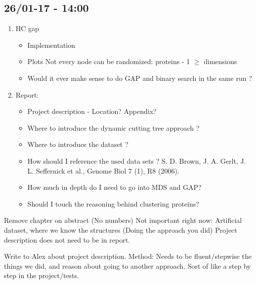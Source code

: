 \documentclass[a4paper,10pt]{article}
\begin{document}
\newpage
\subsection{26/01-17 - 14:00}
\begin{enumerate}
	\item HC gap
		\begin{itemize}
			\item Implementation
			\item Plots
				\subitem Not every node can be randomized: proteins - 1 $\geq$ dimensions
			\item Would it ever make sense to do GAP and binary search in the same run ?
		\end{itemize}
	\item Report:
		\begin{itemize}
			\item Project description - Location? Appendix?
			\item Where to introduce the dynamic cutting tree approach ?
			\item Where to introduce the dataset ?
			\item How should I reference the used data sets ?
				\subitem S. D. Brown, J. A. Gerlt, J. L. Seffernick et al., Genome Biol 7 (1), R8 (2006).
			\item How much in depth do I need to go into MDS and GAP?
			\item Should I touch the reasoning behind clustering proteins?
		\end{itemize}
\end{enumerate}
Remove chapter on abstract (No numbers)
Not important right now: Artificial dataset, where we know the structures (Doing the approach you did)
Project description does not need to be in report.

Write to Alex about project description.
Method: Needs to be fluent/stepwise the things we did, and reason about going to another approach.
Sort of like a step by step in the project/tests.
\end{document}
